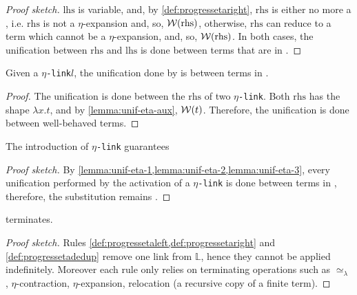 \documentclass[sigconf,natbib=false,review]{acmart}
\newcommand{\UnifRel}{\ensuremath{\simeq}}
\newcommand{\Ue}{\ensuremath{\UnifRel_\lambda}\xspace}
\newcommand{\linkMacro}[1]{\ensuremath{#1}\texttt{-link}\xspace}
\newcommand{\linketa} {\linkMacro{\eta}}
\newcommand{\lhs}{\ensuremath{\mathrm{lhs}}\xspace}
\newcommand{\rhs}{\ensuremath{\mathrm{rhs}}\xspace}
\newcommand{\linkStore}{\ensuremath{\mathbb{L}}\xspace}
\begin{document}
\begin{proof}[Proof sketch]
  \lhs is variable, and, by \cref{def:progressetaright}, \rhs is either no more
  a \maybeeta, i.e. \rhs is not a $\eta$-expansion and, so, $\wellb(\rhs)$,
  otherwise, \rhs can reduce to a term which cannot be a $\eta$-expansion, and,
  so, $\wellb(\rhs)$. In both cases, the unification between \rhs and \lhs
  is done between terms that are in \wellb.
\end{proof}

\begin{lemma}
  Given a \linketa $l$, the unification done by \progressetadedup is between
  terms in \wellb.
  \label{lemma:unif-eta-3}
\end{lemma}

\begin{proof}
  The unification is done between the \rhs of two \linketa. Both \rhs has the
  shape $\lambda x.t$, and by \cref{lemma:unif-eta-aux}, $\mathcal{W}(t)$.
  Therefore, the unification is done between well-behaved terms.
\end{proof}

\begin{lemma}
  The introduction of \linketa guarantees 
  \label{lemma:unif-wellb}
\end{lemma}

\begin{proof}[Proof sketch]
  By \cref{lemma:unif-eta-1,lemma:unif-eta-2,lemma:unif-eta-3}, every
  unification performed by the activation of a \linketa is done between
  terms in \wellb, therefore, the substitution remains \wellb.
\end{proof}

\begin{lemma}
   terminates.
  \label{lemma:prog-eta-terminates}
\end{lemma}

\begin{proof}[Proof sketch]
  Rules \cref{def:progressetaleft,def:progressetaright} and
  \cref{def:progressetadedup} remove one link from \linkStore, hence they
  cannot be applied indefinitely.
  Moreover each rule only relies on terminating operations such as \Ue,
  $\eta$-contraction, $\eta$-expansion, relocation (a recursive copy of a
  finite term).
\end{proof}
\end{document}
